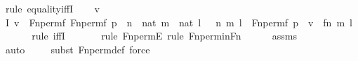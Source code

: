 \begin{isabellebody}
%
\isadelimproof
%
\endisadelimproof
%
\isatagproof
{}\isamarkupfalse%
\ {\isacharparenleft}{\kern0pt}rule\ equality{\isacharunderscore}{\kern0pt}iffI{\isacharparenright}{\kern0pt}\isanewline
\ \ \isamarkupfalse%
\ v\isanewline
\ \ \isamarkupfalse%
\ I{}{\isacharcolon}{\kern0pt}\ {\isachardoublequoteopen}v\ {\isasymin}\ Fn{\isacharunderscore}{\kern0pt}perm{\isacharparenleft}{\kern0pt}f{\isacharprime}{\kern0pt}{\isacharcomma}{\kern0pt}\ Fn{\isacharunderscore}{\kern0pt}perm{\isacharparenleft}{\kern0pt}f{\isacharcomma}{\kern0pt}\ p{\isacharparenright}{\kern0pt}{\isacharparenright}{\kern0pt}\ {\isasymlongleftrightarrow}\ {\isacharparenleft}{\kern0pt}{\isasymexists}n\ {\isasymin}\ nat{\isachardot}{\kern0pt}\ {\isasymexists}m\ {\isasymin}\ nat{\isachardot}{\kern0pt}\ {\isasymexists}l\ {\isasymin}\ {}{\isachardot}{\kern0pt}\ {\isacharless}{\kern0pt}{\isacharless}{\kern0pt}n{\isacharcomma}{\kern0pt}\ m{\isachargreater}{\kern0pt}{\isacharcomma}{\kern0pt}\ l{\isachargreater}{\kern0pt}\ {\isasymin}\ Fn{\isacharunderscore}{\kern0pt}perm{\isacharparenleft}{\kern0pt}f{\isacharcomma}{\kern0pt}\ p{\isacharparenright}{\kern0pt}\ {\isasymand}\ v\ {\isacharequal}{\kern0pt}\ {\isacharless}{\kern0pt}{\isacharless}{\kern0pt}f{\isacharprime}{\kern0pt}{\isacharbackquote}{\kern0pt}n{\isacharcomma}{\kern0pt}\ m{\isachargreater}{\kern0pt}{\isacharcomma}{\kern0pt}\ l{\isachargreater}{\kern0pt}{\isacharparenright}{\kern0pt}{\isachardoublequoteclose}\ \isanewline
\ \ \ \ \isamarkupfalse%
{\isacharparenleft}{\kern0pt}rule\ iffI{\isacharparenright}{\kern0pt}\ \isanewline
\ \ \ \ \ \isamarkupfalse%
{\isacharparenleft}{\kern0pt}rule\ Fn{\isacharunderscore}{\kern0pt}permE{\isacharcomma}{\kern0pt}\ rule\ Fn{\isacharunderscore}{\kern0pt}perm{\isacharunderscore}{\kern0pt}in{\isacharunderscore}{\kern0pt}Fn{\isacharparenright}{\kern0pt}\isanewline
\ \ \ \ \isamarkupfalse%
\ assms\isanewline
\ \ \ \ \ \ \ \ \isamarkupfalse%
\ auto{\isacharbrackleft}{\kern0pt}{}{\isacharbrackright}{\kern0pt}\isanewline
\ \ \ \ \isamarkupfalse%
{\isacharparenleft}{\kern0pt}subst\ Fn{\isacharunderscore}{\kern0pt}perm{\isacharunderscore}{\kern0pt}def{\isacharcomma}{\kern0pt}\ force{\isacharparenright}{\kern0pt}\isanewline
\ \ \ \ \isamarkupfalse%
\isanewline
\ \ \isamarkupfalse%

\end{isabellebody}
